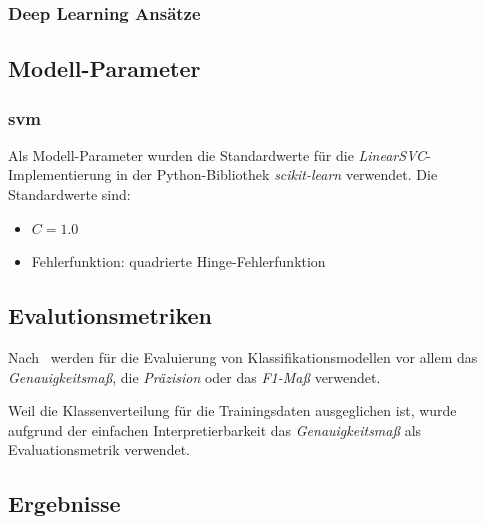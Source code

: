 \subsubsection{Deep Learning Ansätze} \label{sec:deep-learning-ansaetze}

\subsection{Modell-Parameter}\label{sec:modell-parameter}


\subsubsection{\gls{svm}}

Als Modell-Parameter wurden die Standardwerte für die \textit{LinearSVC}-Implementierung in der Python-Bibliothek \textit{scikit-learn} verwendet.
Die Standardwerte sind:

\begin{itemize}
    \item $C = 1.0$
    \item Fehlerfunktion: quadrierte Hinge-Fehlerfunktion
\end{itemize}

\subsection{Evalutionsmetriken}

Nach~\cite{wankhade2022survey} werden für die Evaluierung von Klassifikationsmodellen vor allem das \textit{Genauigkeitsmaß}, die \textit{Präzision} oder das \textit{F1-Maß} verwendet.

Weil die Klassenverteilung für die Trainingsdaten ausgeglichen ist, wurde aufgrund der einfachen Interpretierbarkeit das \textit{Genauigkeitsmaß} als Evaluationsmetrik verwendet.

\subsection{Ergebnisse}

